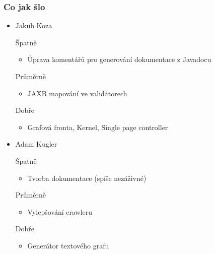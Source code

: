 \documentclass{beamer}
\begin{document}
\begin{frame}[allowframebreaks]\frametitle{Co jak šlo}
  \begin{itemize}
    \item Jakub Koza
     \begin{block}{Špatně} %
       \begin{itemize}
        \item Úprava komentářů pro generování dokumentace z Javadocu
       \end{itemize}
     \end{block}
     \begin{block}{Průměrně} %
        \begin{itemize}
        \item JAXB mapování ve validátorech
       \end{itemize}
     \end{block}
     \begin{block}{Dobře} %
       \begin{itemize}
        \item Grafová fronta, Kernel, Single page controller
       \end{itemize}
     \end{block}
   
    \item Adam Kugler
      \begin{block}{Špatně} %
       \begin{itemize}
        \item Tvorba dokumentace (spíše nezáživné)
       \end{itemize}
     \end{block}
     \begin{block}{Průměrně} %
        \begin{itemize}
        \item Vylepšování crawleru
       \end{itemize}
     \end{block}
     \begin{block}{Dobře} %
       \begin{itemize}
        \item Generátor textového grafu
       \end{itemize}
     \end{block}
  

\end{itemize}
\end{frame}
\end{document}

